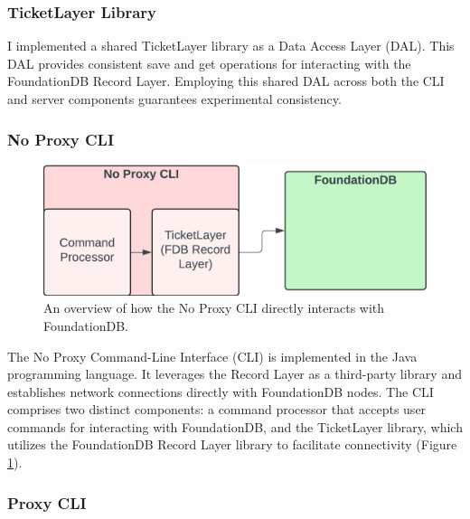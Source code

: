 \documentclass[sigconf]{acmart}
\begin{document}
\subsubsection{TicketLayer Library}

I implemented a shared TicketLayer library as a Data Access Layer (DAL). This DAL provides consistent save and get operations for interacting with the FoundationDB Record Layer. Employing this shared DAL across both the CLI and server components guarantees experimental consistency.

\subsubsection{No Proxy CLI}

\begin{figure}[h]
  \centering
  \includegraphics[width=\linewidth]{diag_code_npc.png}
  \caption{An overview of how the No Proxy CLI directly interacts with FoundationDB.}
  \label{fig:diag_code_npc}
\end{figure}

The No Proxy Command-Line Interface (CLI) is implemented in the Java programming language. It leverages the Record Layer as a third-party library and establishes network connections directly with FoundationDB nodes. The CLI comprises two distinct components: a command processor that accepts user commands for interacting with FoundationDB, and the TicketLayer library, which utilizes the FoundationDB Record Layer library to facilitate connectivity (Figure \ref{fig:diag_code_npc}).

\subsubsection{Proxy CLI}
\end{document}
